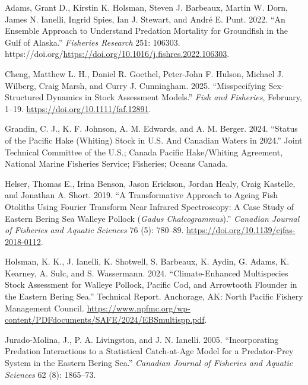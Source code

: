 \documentclass[
  letterpaper,
  DIV=11,
  numbers=noendperiod]{scrreprt}
\newlength{\cslhangindent}
\newenvironment{CSLReferences}[2] %
 {\begin{list}{}{%
  \setlength{\itemindent}{0pt}
  \setlength{\leftmargin}{0pt}
  \setlength{\parsep}{0pt}
  \ifodd #1
   \setlength{\leftmargin}{\cslhangindent}
   \setlength{\itemindent}{-1\cslhangindent}
  \fi
  \setlength{\itemsep}{#2\baselineskip}}}
 {\end{list}}
\begin{document}
\label{refs}
\begin{CSLReferences}{1}{0}
Adams, Grant D., Kirstin K. Holsman, Steven J. Barbeaux, Martin W. Dorn,
James N. Ianelli, Ingrid Spies, Ian J. Stewart, and André E. Punt. 2022.
{``An Ensemble Approach to Understand Predation Mortality for Groundfish
in the Gulf of Alaska.''} \emph{Fisheries Research} 251: 106303.
https://doi.org/\url{https://doi.org/10.1016/j.fishres.2022.106303}.

Cheng, Matthew L. H., Daniel R. Goethel, Peter-John F. Hulson, Michael
J. Wilberg, Craig Marsh, and Curry J. Cunningham. 2025. {``Misspecifying
{Sex-Structured} {Dynamics} in {Stock} {Assessment} {Models}.''}
\emph{{Fish} and {Fisheries}}, February, 1--19.
\url{https://doi.org/10.1111/faf.12891}.

Grandin, C. J., K. F. Johnson, A. M. Edwards, and A. M. Berger. 2024.
{``Status of the {Pacific} {Hake} (Whiting) Stock in {U.S.} And
{Canadian} Waters in 2024.''} Joint Technical Committee of the U.S.;
Canada Pacific Hake/Whiting Agreement, National Marine Fisheries
Service; Fisheries; Oceans Canada.

Helser, Thomas E., Irina Benson, Jason Erickson, Jordan Healy, Craig
Kastelle, and Jonathan A. Short. 2019. {``A Transformative Approach to
Ageing Fish Otoliths Using Fourier Transform Near Infrared Spectroscopy:
A Case Study of Eastern Bering Sea Walleye Pollock ({\emph{Gadus
Chalcogrammus}}).''} \emph{Canadian Journal of Fisheries and Aquatic
Sciences} 76 (5): 780--89.
\url{https://doi.org/10.1139/cjfas-2018-0112}.

Holsman, K. K., J. Ianelli, K. Shotwell, S. Barbeaux, K. Aydin, G.
Adams, K. Kearney, A. Sulc, and S. Wassermann. 2024. {``Climate-Enhanced
Multispecies Stock Assessment for Walleye Pollock, {Pacific} Cod, and
Arrowtooth Flounder in the Eastern {Bering} {Sea}.''} Technical Report.
Anchorage, AK: North Pacific Fishery Management Council.
\url{https://www.npfmc.org/wp-content/PDFdocuments/SAFE/2024/EBSmultispp.pdf}.

Jurado-Molina, J., P. A. Livingston, and J. N. Ianelli. 2005.
{``Incorporating Predation Interactions to a Statistical Catch-at-Age
Model for a Predator-Prey System in the Eastern Bering Sea.''}
\emph{Canadian Journal of Fisheries and Aquatic Sciences} 62 (8):
1865--73.


\end{CSLReferences}
\end{document}
